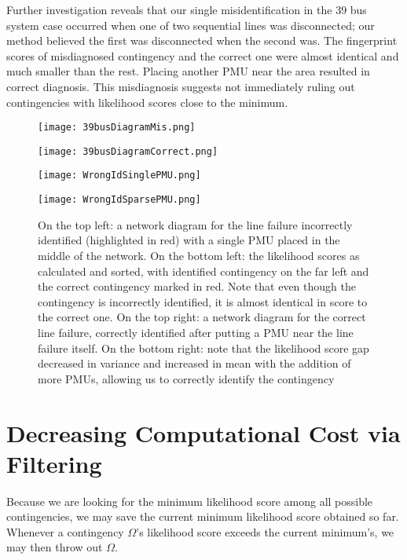 Further investigation reveals that our single misidentification in the 39 bus system case occurred when one of two sequential lines was disconnected; our method believed the first was disconnected when the second was. The fingerprint scores of misdiagnosed contingency and the correct one were almost identical and much smaller than the rest. Placing another PMU near the area resulted in correct diagnosis. This misdiagnosis suggests not immediately ruling out contingencies with likelihood scores close to the minimum. 

\begin{figure}[!ht] 
  \centering
  \begin{minipage}[b]{0.45\textwidth}
    \texttt{[image: 39busDiagramMis.png]}
  \end{minipage}
  \hfill
  \begin{minipage}[b]{0.45\textwidth}
    \texttt{[image: 39busDiagramCorrect.png]}
  \end{minipage}
    \begin{minipage}[b]{0.45\textwidth}
    \texttt{[image: WrongIdSinglePMU.png]}
  \end{minipage}
  \hfill
  \begin{minipage}[b]{0.45\textwidth}
    \texttt{[image: WrongIdSparsePMU.png]}
  \end{minipage}
  \caption{On the top left: a network diagram for the line failure incorrectly identified (highlighted in red) with a single PMU placed in the middle of the network. On the bottom left: the likelihood scores as calculated and sorted, with identified contingency on the far left and the correct contingency marked in red. Note that even though the contingency is incorrectly identified, it is almost identical in score to the correct one. On the top right: a network diagram for the correct line failure, correctly identified after putting a PMU near the line failure itself. On the bottom right: note that the likelihood score gap decreased in variance and increased in mean with the addition of more PMUs, allowing us to correctly identify the contingency}
\end{figure}  \label{FullResultsGrid}

\section{Decreasing Computational Cost via Filtering}
Because we are looking for the minimum likelihood score among all possible contingencies, we may save the current minimum likelihood score obtained so far. Whenever a contingency $\Omega$'s likelihood score exceeds the current minimum's, we may then throw out $\Omega$. 

